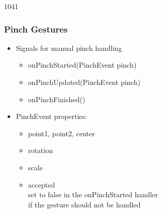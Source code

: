 \begin{slide}{1041}\frametitle{Pinch Gestures}

\begin{itemize}
\item Signals for manual pinch handling
  \begin{itemize}
  \item onPinchStarted(PinchEvent pinch)
  \item onPinchUpdated(PinchEvent pinch)
  \item onPinchFinished()
  \end{itemize}\medskip

\item PinchEvent properties:
  \begin{itemize}
  \item point1, point2, center
  \item rotation
  \item scale
  \item accepted\\
    set to false in the onPinchStarted handler\\
    if the gesture should not be handled

  \end{itemize}

\end{itemize}

\end{slide}

